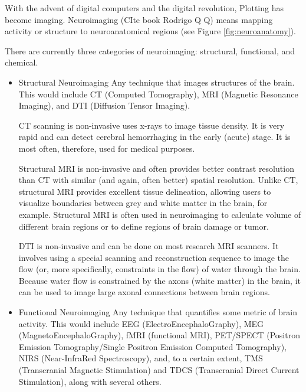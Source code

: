 \begin{story}[Neuroimaging]
With the advent of digital computers and the digital revolution, Plotting has become imaging.  Neuroimaging (CIte book Rodrigo Q Q) means mapping activity or structure to neuroanatomical regions (see Figure \ref{fig:neuroanatomy}).

There are currently three categories of neuroimaging: structural, functional, and chemical. 

\begin{itemize}
\item Structural Neuroimaging
Any technique that images structures of the brain. This would include CT (Computed Tomography), MRI (Magnetic Resonance Imaging), and DTI (Diffusion Tensor Imaging).

CT scanning is non-invasive uses x-rays to image tissue density. It is very rapid and can detect cerebral hemorrhaging in the early (acute) stage. It is most often, therefore, used for medical purposes.

Structural MRI is non-invasive and often provides better contrast resolution than CT with similar (and again, often better) spatial resolution. Unlike CT, structural MRI provides excellent tissue delineation, allowing users to visualize boundaries between grey and white matter in the brain, for example. Structural MRI is often used in neuroimaging to calculate volume of different brain regions or to define regions of brain damage or tumor.

DTI is non-invasive and can be done on most research MRI scanners. It involves using a special scanning and reconstruction sequence to image the flow (or, more specifically, constraints in the flow) of water through the brain. Because water flow is constrained by the axons (white matter) in the brain, it can be used to image large axonal connections between brain regions.

\item Functional Neuroimaging
Any technique that quantifies some metric of brain activity. This would include EEG (ElectroEncephaloGraphy), MEG (MagnetoEncephaloGraphy), fMRI (functional MRI), PET/SPECT (Positron Emission Tomography/Single Positron Emission Computed Tomography), NIRS (Near-InfraRed Spectroscopy), and, to a certain extent, TMS (Transcranial Magnetic Stimulation) and TDCS (Transcranial Direct Current Stimulation), along with several others.
\end{itemize}

\end{story}

